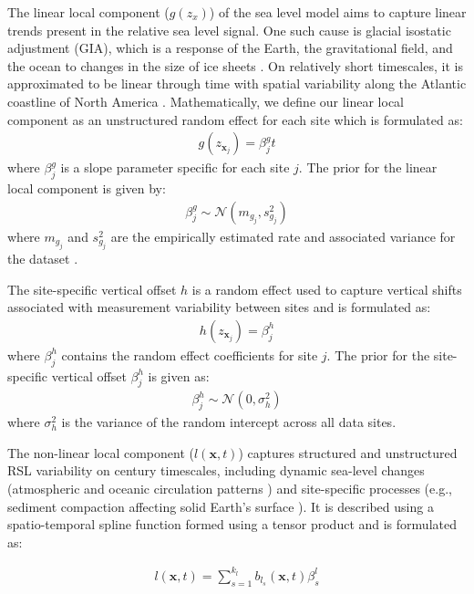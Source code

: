 The linear local component (\(g(z_x)\)) of the sea level model aims to capture linear trends present in the relative sea level signal. One such cause is glacial isostatic adjustment (GIA), which is a response of the Earth, the gravitational field, and the ocean to changes in the size of ice sheets \citep{Whitehouse2018}. On relatively short timescales, it is approximated to be linear through time with spatial variability along the Atlantic coastline of North America \citep{Engelhart2009}. Mathematically, we define our linear local component as an unstructured random effect for each site which is formulated as:
\begin{align}
g(z_{\mathbf{x}_j}) = \beta^{g}_jt
\end{align}
where \(\beta^{g}_j\) is a slope parameter specific for each site \(j\). The prior for the linear local component is given by:
\begin{align}
\beta_j^g \sim \mathcal{N} (m_{g_j}, s^2_{g_j})
\end{align}
where \(m_{g_j}\) and \(s^2_{g_j}\) are the empirically estimated rate and associated variance for the dataset \citep[refer to][ for a detailed description]{Upton2023noisy}.

The site-specific vertical offset \(h\) is a random effect used to capture vertical shifts associated with measurement variability between sites and is formulated as:
\begin{align}
h(z_{\mathbf{x}_j}) = \beta^{h}_j
 \end{align}
where \(\beta^{h}_j\) contains the random effect coefficients for site \(j\). The prior for the site-specific vertical offset \(\beta^{h}_j\) is given as:
\begin{align}
\beta^{h}_j \sim \mathcal{N}(0, \sigma_h^2)
\end{align}
where \(\sigma_h^2\) is the variance of the random intercept across all data sites.

The non-linear local component (\(l(\mathbf{x}, t)\)) captures structured and unstructured RSL variability on century timescales, including dynamic sea-level changes (atmospheric and oceanic circulation patterns \citep{Gregory2019}) and site-specific processes (e.g., sediment compaction affecting solid Earth's surface \citep{Horton2018}). It is described using a spatio-temporal spline function formed using a tensor product and is formulated as:

\begin{align}
  l(\mathbf{x}, t) = \sum_{s=1}^{k_l} b_{l_s}(\mathbf{x},t) \beta^{l}_s
\end{align}

